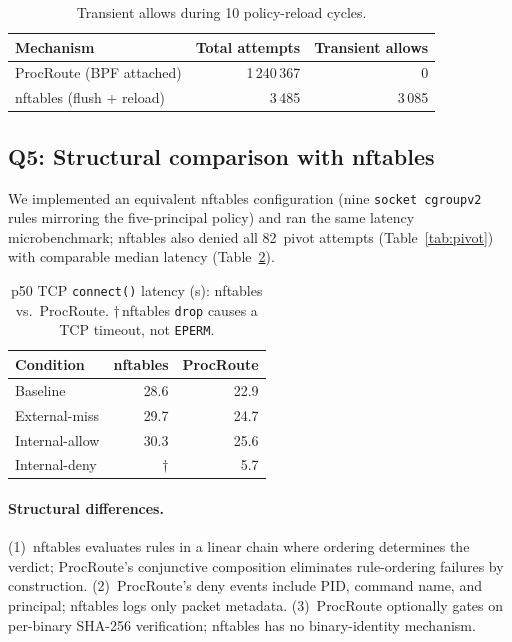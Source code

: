 \documentclass[sigconf]{acmart}
\begin{document}
\begin{table}[t]
\centering
\caption{Transient allows during 10 policy-reload cycles.}
\label{tab:update-safety}
\begin{tabular}{lrr}
\toprule
Mechanism & Total attempts & Transient allows \\
\midrule
ProcRoute (BPF attached)  & 1\,240\,367 & 0 \\
nftables (flush + reload) &     3\,485  & 3\,085 \\
\bottomrule
\end{tabular}
\end{table}

\subsection{Q5: Structural comparison with nftables}
\label{sec:appendix:q5}

We implemented an equivalent nftables configuration (nine
\texttt{socket\allowbreak\,cgroupv2} rules mirroring the
five-principal policy) and ran the same latency
microbenchmark; nftables also denied all 82~pivot attempts
(Table~\ref{tab:pivot}) with comparable median latency
(Table~\ref{tab:nft-comparison}).

\begin{table}[t]
\centering
\caption{p50 TCP \texttt{connect()} latency (\textmu{}s): nftables
  vs.\ ProcRoute.  $\dagger$\,nftables \texttt{drop} causes a
  TCP timeout, not \texttt{EPERM}.}
\label{tab:nft-comparison}
\begin{tabular}{lrr}
\toprule
Condition & nftables & ProcRoute \\
\midrule
Baseline       & 28.6 &  22.9 \\
External-miss  & 29.7 &  24.7 \\
Internal-allow & 30.3 &  25.6 \\
Internal-deny  & $\dagger$ &  5.7 \\
\bottomrule
\end{tabular}
\end{table}

\paragraph{Structural differences.}
(1)~nftables evaluates rules in a linear chain where
ordering determines the verdict; ProcRoute's conjunctive
composition eliminates rule-ordering failures by
construction.
(2)~ProcRoute's deny events include PID, command name,
and principal; nftables logs only packet metadata.
(3)~ProcRoute optionally gates on per-binary SHA-256
verification; nftables has no binary-identity mechanism.
\end{document}
